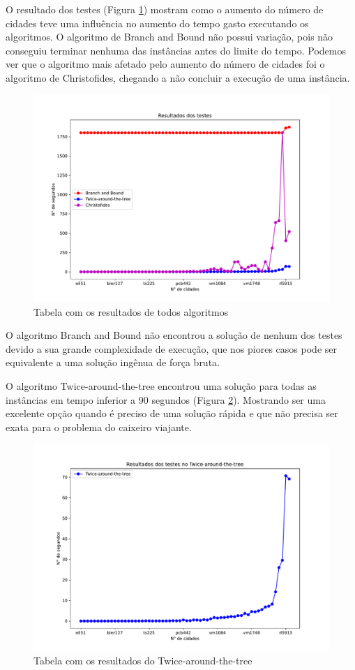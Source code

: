 \documentclass[12pt]{article}
\begin{document}
O resultado dos testes (Figura \ref{fig:fig1}) mostram como o aumento do número de cidades teve uma influência no aumento do tempo gasto executando os algoritmos. O algoritmo de Branch and Bound não possui variação, pois não conseguiu terminar nenhuma das instâncias antes do limite do tempo. Podemos ver que o algoritmo mais afetado pelo aumento do número de cidades foi o algoritmo de Christofides, chegando a não concluir a execução de uma instância.

\begin{figure}[ht]
\centering
\includegraphics[width=.8\textwidth]{../Figura1.pdf}
\caption{Tabela com os resultados de todos algoritmos}
\label{fig:fig1}
\end{figure}

O algoritmo Branch and Bound não encontrou a solução de nenhum dos testes devido a sua grande complexidade de execução, que nos piores casos pode ser equivalente a uma solução ingênua de força bruta.

O algoritmo Twice-around-the-tree encontrou uma solução para todas as instâncias em tempo inferior a 90 segundos (Figura \ref{fig:fig2}). Mostrando ser uma excelente opção quando é preciso de uma solução rápida e que não precisa ser exata para o problema do caixeiro viajante.

\begin{figure}[ht]
\centering
\includegraphics[width=.6\textwidth]{../Figura2.pdf}
\caption{Tabela com os resultados do Twice-around-the-tree}
\label{fig:fig2}
\end{figure}
\end{document}
